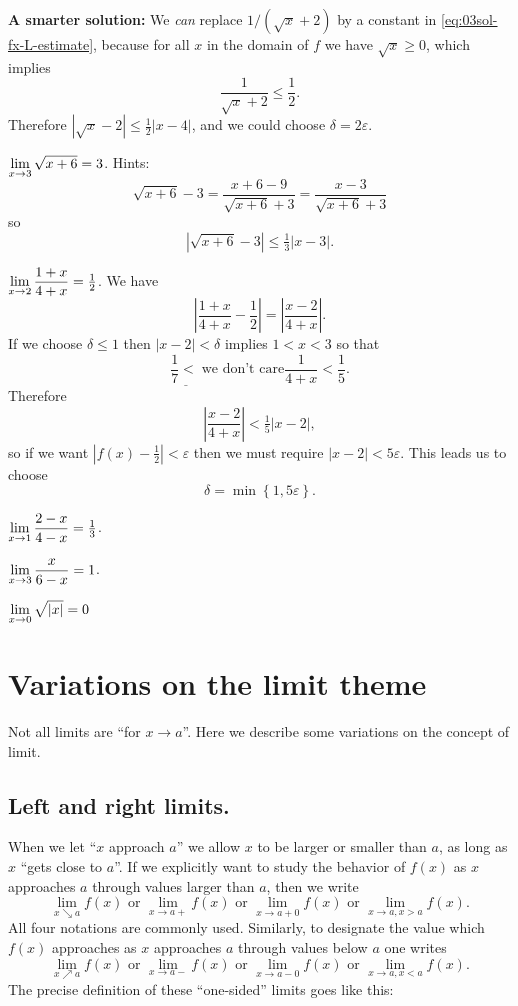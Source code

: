 \begin{multicols}{3}
\textbf{A smarter solution:} We \emph{can} replace $1/(\sqrt x +2)$
by a constant in \eqref{eq:03sol-fx-L-estimate}, because for all $x$
in the domain of $f$ we have $\sqrt x \geq0$, which implies
\[
\frac1{\sqrt x+ 2} \leq \frac 12.
\]
Therefore $|\sqrt x- 2| \leq \frac12|x-4|$, and we could choose
$\delta = 2\varepsilon$.
\endanswer

\problem $\displaystyle \lim_{x\to3}\sqrt{x+6} = 3$. 
\answer 
Hints:
\[
\sqrt{x+6}-3 = \frac{x+6-9}{\sqrt{x+6} + 3} = \frac{x-3}{\sqrt{x+6} +
  3}
\]
so
\[
|\sqrt{x+6} - 3|\leq \tfrac13 |x-3|.
\]
\endanswer

\problem $\displaystyle \lim_{x\to 2}\frac{1+x}{4+x} = \tfrac12$. 
\answer 
We have
\[
\left|\frac{1+x}{4+x} - \frac{1}{2}\right| =
\left|\frac{x-2}{4+x}\right|.
\]
If we choose $\delta\le1$ then $|x-2|<\delta$ implies $1<x<3$ so that
\[
\underline{\frac17 <\;}{\text{we don't care}} \frac{1}{4+x} <
\frac15.
\]
Therefore
\[
\left|\frac{x-2}{4+x}\right| < \tfrac15 |x-2|,
\]
so if we want $|f(x) - \tfrac12| <\varepsilon$ then we must require
$|x-2|< 5\varepsilon$.  This leads us to choose
\[
\delta = \min\left\{ 1, 5\varepsilon \right\}.
\]
\endanswer

\problem $\displaystyle \lim_{x\to 1}\frac{2-x}{4-x} = \tfrac13$. 

\problem $\displaystyle \lim_{x\to 3}\frac{x}{6-x} = 1$. 

\problem \(\displaystyle \lim_{x\to 0} \sqrt{|x|} = 0\) 
\end{multicols}


\noproblemfont
\section{Variations on the limit theme} 
\label{sec:variations-on-limit-theme}%
Not all limits are ``for $x\to a$''.  Here we describe some variations on the
concept of limit.

\subsection{Left and right limits. } 
When we let ``$x$ approach $a$'' we allow $x$ to be larger or smaller
than $a$, as long as $x$ ``gets close to $a$''.  If we explicitly want to study
the behavior of $f(x)$ as $x$ approaches $a$ through values larger than
$a$, then we write
\[
\lim_{x\searrow a} f(x)\text{ or } \lim_{x\to a+} f(x) \text{ or }
\lim_{x\to a+0} f(x) \text{ or } \lim_{x\to a, x>a} f(x).
\]
All four notations are commonly used.  Similarly, to designate the value which
$f(x)$ approaches as $x$ approaches $a$ through values below $a$ one writes
\[
\lim_{x\nearrow a} f(x)\text{ or } \lim_{x\to a-} f(x) \text{ or }
\lim_{x\to a-0} f(x) \text{ or } \lim_{x\to a, x<a} f(x).
\]
The precise definition of these ``one-sided'' limits goes like this:

